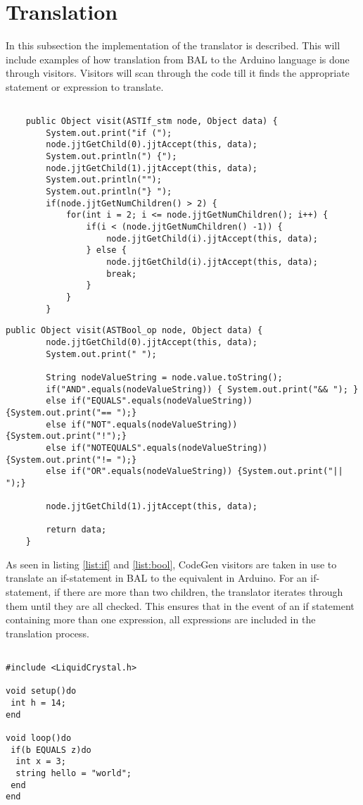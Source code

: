 \section{Translation}
In this subsection the implementation of the translator is described. This will include examples of how translation from BAL to the Arduino language is done through visitors.
Visitors will scan through the code till it finds the appropriate statement or expression to translate.

\begin{lstlisting}[caption=Visitor for translation of an if-statement, label=list:if]

	public Object visit(ASTIf_stm node, Object data) {
		System.out.print("if (");
		node.jjtGetChild(0).jjtAccept(this, data);
		System.out.println(") {");
		node.jjtGetChild(1).jjtAccept(this, data);
		System.out.println("");
		System.out.println("} ");
		if(node.jjtGetNumChildren() > 2) {
			for(int i = 2; i <= node.jjtGetNumChildren(); i++) {
				if(i < (node.jjtGetNumChildren() -1)) {
					node.jjtGetChild(i).jjtAccept(this, data);
				} else {
					node.jjtGetChild(i).jjtAccept(this, data);
					break;
				}
			}
		}

\end{lstlisting}

\begin{lstlisting}[caption=Visitor for translation of an boolean operators, label=list:bool]
	public Object visit(ASTBool_op node, Object data) {
		node.jjtGetChild(0).jjtAccept(this, data);
		System.out.print(" ");

		String nodeValueString = node.value.toString();
		if("AND".equals(nodeValueString)) { System.out.print("&& "); }
		else if("EQUALS".equals(nodeValueString)) {System.out.print("== ");}
		else if("NOT".equals(nodeValueString)) {System.out.print("!");}
		else if("NOTEQUALS".equals(nodeValueString)) {System.out.print("!= ");}
		else if("OR".equals(nodeValueString)) {System.out.print("|| ");}

		node.jjtGetChild(1).jjtAccept(this, data);

		return data;
	}
\end{lstlisting}

As seen in listing \ref{list:if} and  \ref{list:bool}, CodeGen visitors are taken in use to translate an if-statement in BAL to the equivalent in Arduino. For an if-statement, if there are more than two children, the translator iterates through them until they are all checked. This ensures that in the event of an if statement containing more than one expression, all expressions are included in the translation process.\\
\pagebreak
\begin{lstlisting}[caption=Example of an if-statement written in BAL, label=list:phstmt]

#include <LiquidCrystal.h>

void setup()do
 int h = 14;
end

void loop()do
 if(b EQUALS z)do
  int x = 3;
  string hello = "world";
 end
end
\end{lstlisting}

